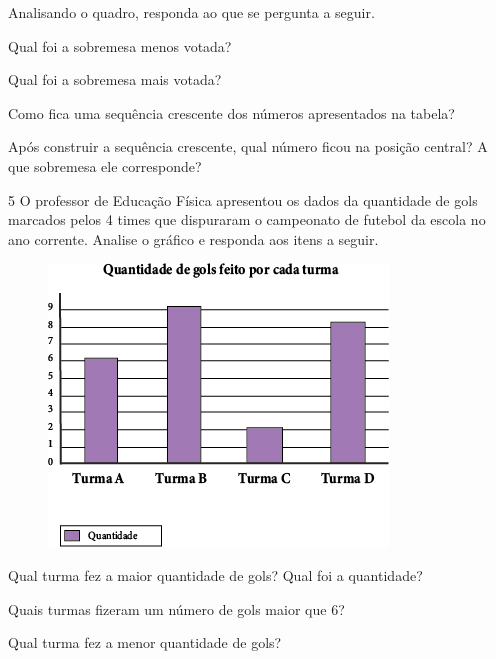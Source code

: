 Analisando o quadro, responda ao que se pergunta a seguir.

\begin{escolha}
\item
  Qual foi a sobremesa menos votada?

\item
  Qual foi a sobremesa mais votada?

\item
  Como fica uma sequência crescente dos números apresentados na tabela?

\item
  Após construir a sequência crescente, qual número ficou na posição
  central? A que sobremesa ele corresponde?
\end{escolha}

\num{5} O professor de Educação Física apresentou os dados da quantidade de gols
marcados pelos 4 times que dispuraram o campeonato de futebol da escola no ano
corrente. Analise o gráfico e responda aos itens a seguir.

\begin{figure}[htpb!]
\centering
\includegraphics[width=.85\textwidth]{media/image44.png}
\end{figure}

\begin{escolha}
\item Qual turma fez a maior quantidade de gols? Qual foi a quantidade?

\item Quais turmas fizeram um número de gols maior que 6?

\item  Qual turma fez a menor quantidade de gols?
\end{escolha}

